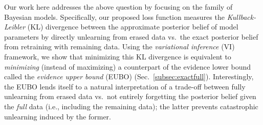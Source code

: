 \documentclass{article}
\theoremstyle{definition}
\begin{document}

Our work here addresses the above question by focusing on the family of Bayesian models.
Specifically, our proposed loss function measures the \emph{Kullback-Leibler} (KL) divergence between the approximate posterior belief of model parameters by directly unlearning from erased data vs.~the exact posterior belief from retraining with remaining data. Using the \emph{variational inference} (VI) framework, we show that minimizing this KL divergence is equivalent to \emph{minimizing} (instead of maximizing) a counterpart of the evidence lower bound called the \emph{evidence upper bound} (EUBO) (Sec.~\ref{subsec:exactfull}). Interestingly, the EUBO lends itself to a natural interpretation of a trade-off between fully unlearning from erased data vs.~not entirely forgetting the posterior belief given the \emph{full} data (i.e., including the remaining data); the latter prevents catastrophic unlearning induced by the former.


\end{document}
